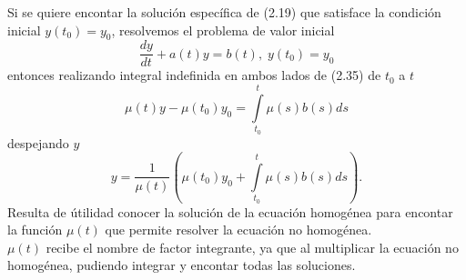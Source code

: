 \documentclass[10pt,a4paper,notitlepage]{report}
\begin{document}
\begin{itemize}
\begin{equation}
 \end{equation}
 Si se quiere encontar la solución específica de (2.19)  que satisface la condición inicial $y (t_{0}) = y_{0}$, resolvemos el problema de valor inicial
 \begin{equation}
\frac{dy}{dt} + a(t) y = b(t), \; y(t_{0}) = y_{0}
 \end{equation}
 entonces realizando integral indefinida en ambos lados de (2.35) de $t_{0}$ a $t$
 \begin{equation}
\mu(t) y - \mu (t_{0}) y_{0} = \int\limits_{t_{0}}^{t} \mu (s) b(s) ds
 \end{equation} 
 despejando $y$
 \begin{equation}
y = \frac{1}{\mu(t)} (\mu (t_{0}) y_{0} + \int\limits_{t_{0}}^{t} \mu(s) b(s) ds).
\end{equation}
Resulta de útilidad conocer la solución de la ecuación homogénea para encontar la función $\mu (t)$ que permite resolver la ecuación no homogénea. \\
$\mu(t)$ recibe el nombre de factor integrante, ya que al multiplicar la ecuación no homogénea, pudiendo integrar y encontar todas las soluciones.

\end{itemize}
\end{document}
